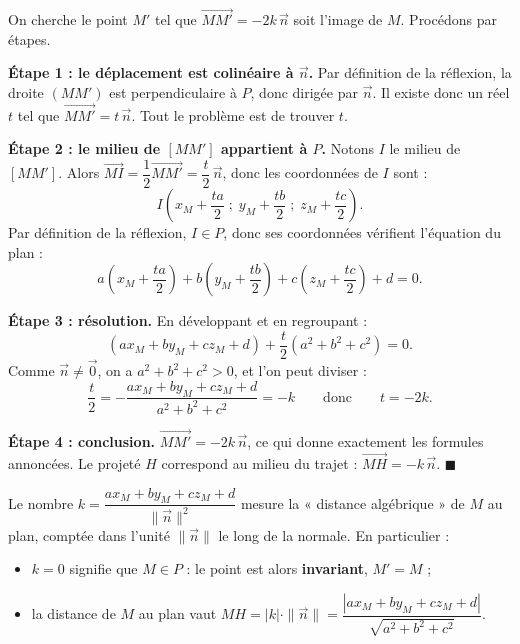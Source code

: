 \documentclass[11pt]{article}
\begin{document}
\begin{experience}
On cherche le point $M'$ tel que $\overrightarrow{MM'}=-2k\,\vec{n}$ soit l'image de $M$. Procédons par étapes.

\textbf{Étape 1 : le déplacement est colinéaire à $\vec{n}$.}
Par définition de la réflexion, la droite $(MM')$ est perpendiculaire à $P$, donc dirigée par $\vec{n}$. Il existe donc un réel $t$ tel que $\overrightarrow{MM'}=t\,\vec{n}$. Tout le problème est de trouver $t$.

\textbf{Étape 2 : le milieu de $[MM']$ appartient à $P$.}
Notons $I$ le milieu de $[MM']$. Alors $\overrightarrow{MI}=\dfrac{1}{2}\overrightarrow{MM'}=\dfrac{t}{2}\,\vec{n}$, donc les coordonnées de $I$ sont :
\[ I\left(x_M+\dfrac{ta}{2}\;;\;y_M+\dfrac{tb}{2}\;;\;z_M+\dfrac{tc}{2}\right). \]
Par définition de la réflexion, $I\in P$, donc ses coordonnées vérifient l'équation du plan :
\[ a\left(x_M+\dfrac{ta}{2}\right)+b\left(y_M+\dfrac{tb}{2}\right)+c\left(z_M+\dfrac{tc}{2}\right)+d=0. \]

\textbf{Étape 3 : résolution.}
En développant et en regroupant :
\[ (ax_M+by_M+cz_M+d)+\dfrac{t}{2}(a^2+b^2+c^2)=0. \]
Comme $\vec{n}\neq\vec{0}$, on a $a^2+b^2+c^2>0$, et l'on peut diviser :
\[ \dfrac{t}{2}=-\dfrac{ax_M+by_M+cz_M+d}{a^2+b^2+c^2}=-k \qquad\text{donc}\qquad t=-2k. \]

\textbf{Étape 4 : conclusion.}
$\overrightarrow{MM'}=-2k\,\vec{n}$, ce qui donne exactement les formules annoncées. Le projeté $H$ correspond au milieu du trajet : $\overrightarrow{MH}=-k\,\vec{n}$. \quad$\blacksquare$
\end{experience}

\begin{aretenir}
Le nombre $k=\dfrac{ax_M+by_M+cz_M+d}{\|\vec{n}\|^2}$ mesure la « distance algébrique » de $M$ au plan, comptée dans l'unité $\|\vec{n}\|$ le long de la normale. En particulier :
\begin{itemize}
\item $k=0$ signifie que $M\in P$ : le point est alors \textbf{invariant}, $M'=M$ ;
\item la distance de $M$ au plan vaut $MH=|k|\cdot\|\vec{n}\|=\dfrac{|ax_M+by_M+cz_M+d|}{\sqrt{a^2+b^2+c^2}}$.
\end{itemize}
\end{aretenir}
\end{document}
